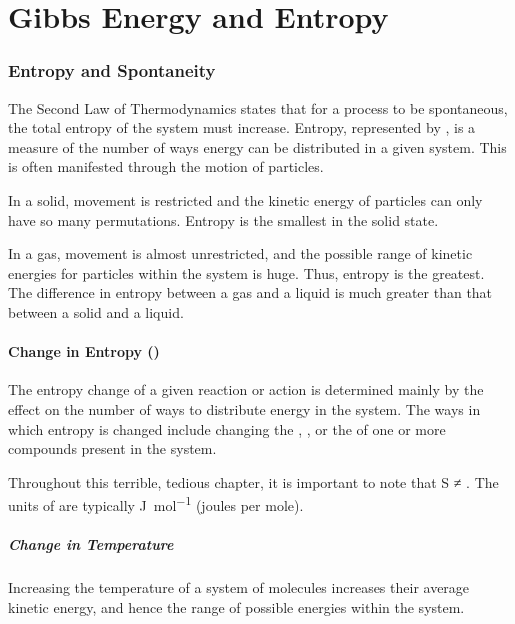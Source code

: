 
\pagebreak
\part{Gibbs Energy and Entropy}

	\section{Entropy and Spontaneity}

		The Second Law of Thermodynamics states that for a process to be spontaneous, the total entropy of the system must increase. Entropy, represented by , is a measure of the number of ways energy can be distributed in a given system. This is often manifested through
		the motion of particles.

		In a solid, movement is restricted and the kinetic energy of particles can only have so many permutations. Entropy is the smallest in the
		solid state.

		In a gas, movement is almost unrestricted, and the possible range of kinetic energies for particles within the system is huge. Thus,
		entropy is the greatest. The difference in entropy between a gas and a liquid is much greater than that between a solid and a liquid.


		\subsection{Change in Entropy (\entr{})}

			The entropy change of a given reaction or action is determined mainly by the effect on the number of ways to distribute energy in the
			system. The ways in which entropy is changed include changing the , , or the
			 of one or more compounds present in the system.

			Throughout this terrible, tedious chapter, it is important to note that
			S ≠ \entr{}. The units of \entr{} are typically \si{\joule\per\mole} (joules per mole).

			\pagebreak
			\subsubsection{Change in Temperature}

				Increasing the temperature of a system of molecules increases their average kinetic energy, and hence the range of possible
				energies within the system.

